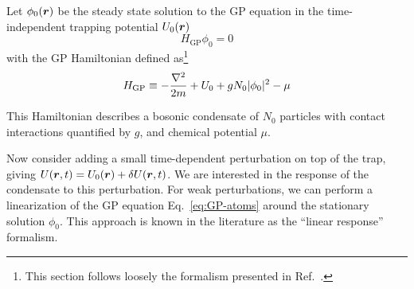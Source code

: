 Let $\phi_0(\bm{r})$ be the steady state solution to the
GP equation in the time-independent trapping potential $U_0(\bm{r})$
%
\begin{equation}\label{eq:GP-atoms}
  H_{\text{GP}} \phi_0 = 0
\end{equation}
% 
with the GP Hamiltonian defined as\footnote{This section follows
  loosely the formalism presented in Ref.~\cite{9783540410478}.}
%
\begin{equation}\label{eq:GP-ham}
  H_{\text{GP}} \equiv -\frac{\nabla^2}{2m} + U_0 + gN_0\vert \phi_0 \vert^2 - \mu
\end{equation}
% 

This Hamiltonian describes a bosonic condensate of $N_0$ particles with
contact interactions quantified by $g$, and chemical potential $\mu$.

Now consider adding a small time-dependent perturbation on top of the
trap, giving $U(\bm{r},t)=U_0(\bm{r}) + \delta U(\bm{r},t)$. We are interested
in the response of the condensate to this perturbation.  For weak
perturbations, we can perform a linearization of the GP equation
Eq.~\eqref{eq:GP-atoms} around the stationary solution $\phi_0$. This
approach is known in the literature as the ``linear response''
formalism.

